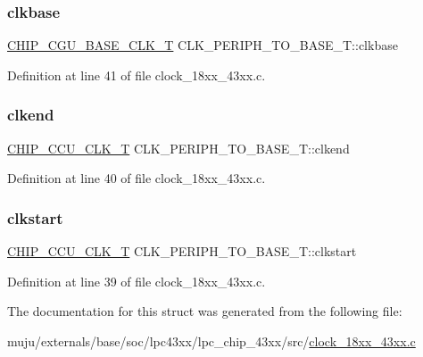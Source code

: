 \subsubsection{\texorpdfstring{clkbase}{clkbase}}
{\footnotesize\ttfamily \hyperlink{chip__clocks_8h_a31e266dd83cc66eb866d8d051ffd1d45}{C\+H\+I\+P\+\_\+\+C\+G\+U\+\_\+\+B\+A\+S\+E\+\_\+\+C\+L\+K\+\_\+T} C\+L\+K\+\_\+\+P\+E\+R\+I\+P\+H\+\_\+\+T\+O\+\_\+\+B\+A\+S\+E\+\_\+\+T\+::clkbase}



Definition at line 41 of file clock\+\_\+18xx\+\_\+43xx.\+c.

\mbox{\label{struct_c_l_k___p_e_r_i_p_h___t_o___b_a_s_e___t_aff1764d78ef6484350cd8ff2ce5e7b11}} 
\subsubsection{\texorpdfstring{clkend}{clkend}}
{\footnotesize\ttfamily \hyperlink{chip__clocks_8h_a45bb23228b9831321626c103ada7c60b}{C\+H\+I\+P\+\_\+\+C\+C\+U\+\_\+\+C\+L\+K\+\_\+T} C\+L\+K\+\_\+\+P\+E\+R\+I\+P\+H\+\_\+\+T\+O\+\_\+\+B\+A\+S\+E\+\_\+\+T\+::clkend}



Definition at line 40 of file clock\+\_\+18xx\+\_\+43xx.\+c.

\mbox{\label{struct_c_l_k___p_e_r_i_p_h___t_o___b_a_s_e___t_a167ff25462aba1b7e173f3b59ff9d46f}} 
\subsubsection{\texorpdfstring{clkstart}{clkstart}}
{\footnotesize\ttfamily \hyperlink{chip__clocks_8h_a45bb23228b9831321626c103ada7c60b}{C\+H\+I\+P\+\_\+\+C\+C\+U\+\_\+\+C\+L\+K\+\_\+T} C\+L\+K\+\_\+\+P\+E\+R\+I\+P\+H\+\_\+\+T\+O\+\_\+\+B\+A\+S\+E\+\_\+\+T\+::clkstart}



Definition at line 39 of file clock\+\_\+18xx\+\_\+43xx.\+c.



The documentation for this struct was generated from the following file\+:\begin{DoxyCompactItemize}
\item 
muju/externals/base/soc/lpc43xx/lpc\+\_\+chip\+\_\+43xx/src/\hyperlink{clock__18xx__43xx_8c}{clock\+\_\+18xx\+\_\+43xx.\+c}\end{DoxyCompactItemize}

